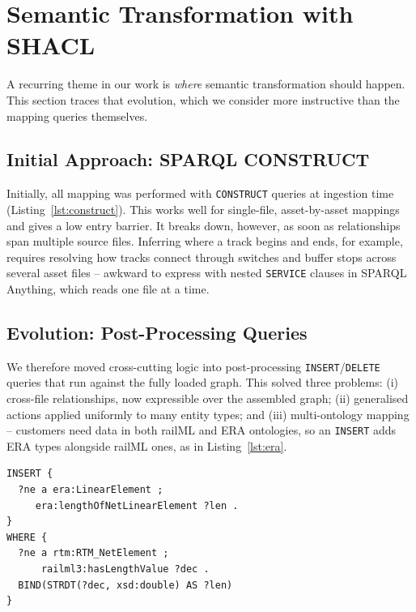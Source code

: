 \documentclass[twocolumn]{ceurart}
\begin{document}
\section{Semantic Transformation with SHACL}
\label{sec:shacl}

A recurring theme in our work is \emph{where} semantic transformation should
happen. This section traces that evolution, which we consider more instructive
than the mapping queries themselves.

\subsection{Initial Approach: SPARQL CONSTRUCT}

Initially, all mapping was performed with \texttt{CONSTRUCT} queries at ingestion
time (Listing~\ref{lst:construct}). This works well for single-file,
asset-by-asset mappings and gives a low entry barrier. It breaks down, however,
as soon as relationships span multiple source files. Inferring where a track
begins and ends, for example, requires resolving how tracks connect through
switches and buffer stops across several asset files -- awkward to express with
nested \texttt{SERVICE} clauses in SPARQL Anything, which reads one file at a
time.

\subsection{Evolution: Post-Processing Queries}

We therefore moved cross-cutting logic into post-processing
\texttt{INSERT}/\texttt{DELETE} queries that run against the fully loaded graph.
This solved three problems: (i) cross-file relationships, now expressible over
the assembled graph; (ii) generalised actions applied uniformly to many entity
types; and (iii) multi-ontology mapping -- customers need data in both railML and
ERA ontologies, so an \texttt{INSERT} adds ERA types alongside railML ones, as
in Listing~\ref{lst:era}.

\begin{lstlisting}[language=sparql,caption={Multi-ontology mapping by
  post-processing: every \texttt{rtm:RTM\_NetElement} also becomes an
  \texttt{era:LinearElement}, giving multiple ontology views over one
  graph.},label={lst:era}]
INSERT {
  ?ne a era:LinearElement ;
     era:lengthOfNetLinearElement ?len .
}
WHERE {
  ?ne a rtm:RTM_NetElement ;
      railml3:hasLengthValue ?dec .
  BIND(STRDT(?dec, xsd:double) AS ?len)
}
\end{lstlisting}
\end{document}
